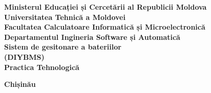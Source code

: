 \begin{titlepage}
  \centering
  {\textbf{Ministerul Educației și Cercetării al Republicii Moldova}}\\[10pt]
  {\textbf{Universitatea Tehnică a Moldovei}}\\
  {\textbf{Facultatea Calculatoare Informatică și Microelectronică}}\\
  {\textbf{Departamentul Ingineria Software și Automatică}}\\[150pt]
  
  {\fontsize{20}{24}\selectfont\textbf{Sistem de gesitonare a bateriilor \\ (DIYBMS)}}\\
  {\fontsize{16}{19.2}\selectfont\textbf{Practica Tehnologică}}\\[100pt]
  
  \begin{center}
  \end{center}
 
  \vfill
  {\centering \textbf{Chișinău \the\year}\par}
  \thispagestyle{empty}
\end{titlepage}
